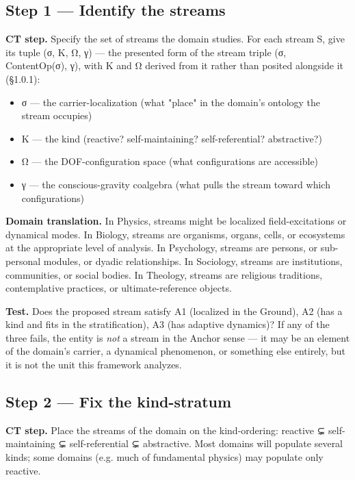 \documentclass[11pt, openany]{book}
\begin{document}
\subsection{Step 1 --- Identify the streams}

\textbf{CT step.} Specify the set of streams the domain studies. For each stream S, give its tuple (σ, K, Ω, γ) --- the presented form of the stream triple (σ, ContentOp(σ), γ), with K and Ω derived from it rather than posited alongside it (§1.0.1):

\begin{itemize}
\item σ --- the carrier-localization (what "place" in the domain's ontology the stream occupies)
\item K --- the kind (reactive? self-maintaining? self-referential? abstractive?)
\item Ω --- the DOF-configuration space (what configurations are accessible)
\item γ --- the conscious-gravity coalgebra (what pulls the stream toward which configurations)
\end{itemize}

\textbf{Domain translation.} In Physics, streams might be localized field-excitations or dynamical modes. In Biology, streams are organisms, organs, cells, or ecosystems at the appropriate level of analysis. In Psychology, streams are persons, or sub-personal modules, or dyadic relationships. In Sociology, streams are institutions, communities, or social bodies. In Theology, streams are religious traditions, contemplative practices, or ultimate-reference objects.

\textbf{Test.} Does the proposed stream satisfy A1 (localized in the Ground), A2 (has a kind and fits in the stratification), A3 (has adaptive dynamics)? If any of the three fails, the entity is \textit{not} a stream in the Anchor sense --- it may be an element of the domain's carrier, a dynamical phenomenon, or something else entirely, but it is not the unit this framework analyzes.

\subsection{Step 2 --- Fix the kind-stratum}

\textbf{CT step.} Place the streams of the domain on the kind-ordering: reactive ⊊ self-maintaining ⊊ self-referential ⊊ abstractive. Most domains will populate several kinds; some domains (e.g. much of fundamental physics) may populate only reactive.
\end{document}
